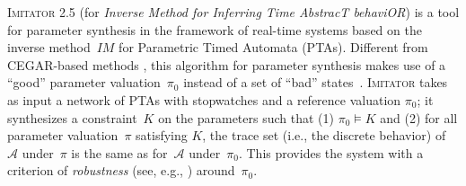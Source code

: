 \documentclass{llncs}
\newcommand{\A}{\mathcal{A}}
\newcommand{\Ko}{K}
\newcommand{\pio}{\pi_0}
\newcommand{\piprime}{\pi}
\newcommand{\IM}{\mathit{IM}}
\newcommand{\hytech}{{\sc HyTech}}
\newcommand{\imitator}{\textsc{Imitator}}
\begin{document}
\imitator{} 2.5 (for \emph{Inverse Method for Inferring Time AbstracT behaviOR}) is a tool for parameter synthesis in the framework of real-time systems based on the inverse method~$\IM$ for Parametric Timed Automata (PTAs).  %
Different from CEGAR-based methods%
, this algorithm for parameter synthesis makes use of a ``good'' parameter valuation~$\pio$ instead of a set of ``bad'' states~\cite{acef09}.
\imitator{} takes as input a network of PTAs with stopwatches
and a reference valuation $\pio$; it synthesizes a constraint~$\Ko$ on the parameters such that (1) $\pio \models \Ko$ and (2) for all parameter valuation~$\piprime$ satisfying $\Ko$, the trace set (i.e., the discrete behavior) of~$\A$ under~$\piprime$ is the same as for~$\A$ under~$\pio$.
This provides the system with a criterion of \emph{robustness} (see, e.g., \cite{m11})
around~$\pio$.


\end{document}
